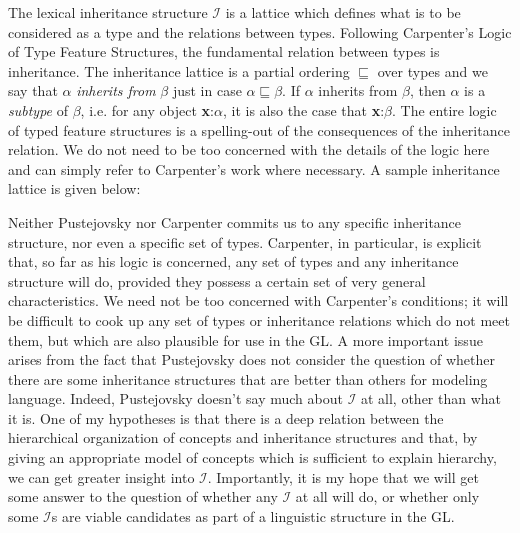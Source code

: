 \documentclass[12pt]{amsart}
\begin{document}
The lexical inheritance structure $\mathcal{I}$ is a lattice which defines what is to be considered as a type and the relations between types. Following Carpenter's Logic of Type Feature Structures, the fundamental relation between types is inheritance. The inheritance lattice is a partial ordering $\sqsubseteq$ over types and we say that $\alpha$ \emph{inherits from} $\beta$ just in case $\alpha\sqsubseteq\beta$. If $\alpha$ inherits from $\beta$, then $\alpha$ is a \emph{subtype} of $\beta$, i.e. for any object {\bf x}:$\alpha$, it is also the case that {\bf x}:$\beta$. The entire logic of typed feature structures is a spelling-out of the consequences of the inheritance relation. We do not need to be too concerned with the details of the logic here and can simply refer to Carpenter's work where necessary. A sample inheritance lattice is given below:
\par\vspace{5mm}
\par\vspace{5mm}

Neither Pustejovsky nor Carpenter commits us to any specific inheritance structure, nor even a specific set of types. Carpenter, in particular, is explicit that, so far as his logic is concerned, any set of types and any inheritance structure will do, provided they possess a certain set of very general characteristics. We need not be too concerned with Carpenter's conditions; it will be difficult to cook up any set of types or inheritance relations which do not meet them, but which are also plausible for use in the GL. A more important issue arises from the fact that Pustejovsky does not consider the question of whether there are some inheritance structures that are better than others for modeling language. Indeed, Pustejovsky doesn't say much about $\mathcal{I}$ at all, other than what it is. One of my hypotheses is that there is a deep relation between the hierarchical organization of concepts and inheritance structures and that, by giving an appropriate model of concepts which is sufficient to explain hierarchy, we can get greater insight into $\mathcal{I}$. Importantly, it is my hope that we will get some answer to the question of whether any $\mathcal{I}$ at all will do, or whether only some $\mathcal{I}$s are viable candidates as part of a linguistic structure in the GL.
\end{document}

